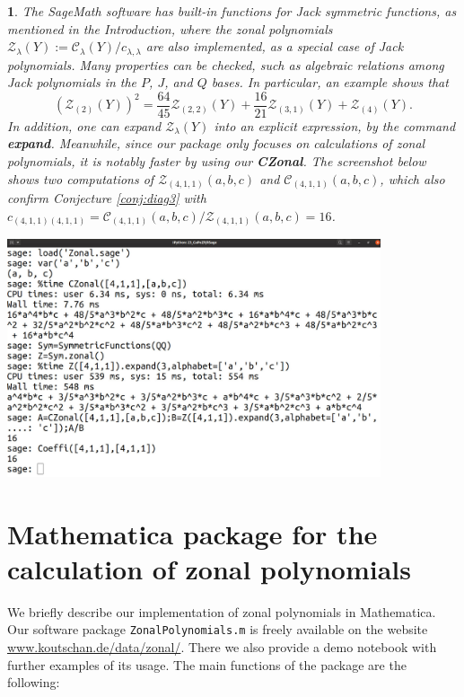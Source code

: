 \documentclass[smallextended]{svjour3}
\newtheorem{rem}[thm]{\protect\remarkname}
\providecommand{\remarkname}{Remark}
\begin{document}
\begin{rem}
The SageMath software has built-in functions for Jack symmetric
functions, as mentioned in the Introduction,
where the zonal polynomials
$\mathcal{Z}_{\lambda}(Y):=\mathcal{C}_\lambda(Y)/c_{\lambda,\lambda}$ are also
implemented, as a special case of Jack polynomials. Many properties can be
checked, such as algebraic relations among Jack polynomials in the $P$, $J$, and
$Q$ bases. In particular, an example shows that
\[
  \left(\mathcal{Z}_{(2)}(Y)\right)^2=\frac{64}{45}\mathcal{Z}_{(2, 2)}(Y) +
  \frac{16}{21}\mathcal{Z}_{(3, 1)}(Y) + \mathcal{Z}_{(4)}(Y).
\]
In addition, one can expand $\mathcal{Z}_{\lambda}(Y)$ into an explicit expression, by
the command \textbf{expand}. Meanwhile, since our package only focuses on
calculations of zonal polynomials, it is notably faster by using our
\textbf{CZonal}. The screenshot below shows two computations of
$\mathcal{Z}_{(4,1,1)}(a,b,c)$ and $\mathcal{C}_{(4,1,1)}(a,b,c)$,
which also confirm
Conjecture \ref{conj:diag3} with $c_{(4,1,1)(4,1,1)}=
\mathcal{C}_{(4,1,1)}(a,b,c)/\mathcal{Z}_{(4,1,1)}(a,b,c)=16$.
\begin{center}
\includegraphics[width=\textwidth, height=7cm]{Screenshot.jpg}
\end{center}
\end{rem}


\section{Mathematica package for the calculation of zonal polynomials}\label{sec:mma}

We briefly describe our implementation of zonal polynomials in Mathematica.
Our software package \texttt{ZonalPolynomials.m} is freely available on
the website \url{www.koutschan.de/data/zonal/}. There we also provide a
demo notebook with further examples of its usage. The main functions of the
package are the following:
\medskip
\end{document}
